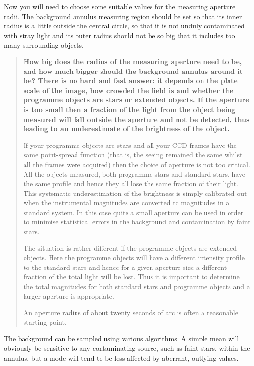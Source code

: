 \documentclass[twoside,11pt]{article}
\begin{document}
\begin{enumerate}
   Now you will need to choose some suitable values for the measuring
   aperture radii.  The background annulus measuring region should be set
   so that its inner radius is a little outside the central circle, so
   that it is not unduly contaminated with stray light and its outer radius
   should not be so big that it includes too many surrounding objects.

  \begin{quote}
   {\bf How big does the radius of the measuring aperture need to be, and
   how much bigger should the background annulus around it be? There is
   no hard and fast answer: it depends on the plate scale of the image,
   how crowded the field is and whether the programme objects are stars
   or extended objects.  If the aperture is too small then a fraction
   of the light from the object being measured will fall outside the
   aperture and not be detected, thus leading to an underestimate of
   the brightness of the object.

   If your programme objects are stars and all your CCD frames have the
   same point-spread function (that is, the seeing remained the same
   whilst all the frames were acquired) then the choice of aperture is
   not too critical.  All the objects measured, both programme stars and
   standard stars, have the same profile and hence they all lose the
   same fraction of their light.  This systematic underestimation of the
   brightness is simply calibrated out when the instrumental magnitudes are
   converted to magnitudes in a standard system.  In this case quite a
   small aperture can be used in order to minimise statistical errors
   in the background and contamination by faint stars.

   The situation is rather different if the programme objects are
   extended objects.  Here the programme objects will have a different
   intensity profile to the standard stars and hence for a given
   aperture size a different fraction of the total light will be lost.
   Thus it is important to determine the total magnitudes for both
   standard stars and programme objects and a larger aperture is
   appropriate.

   An aperture radius of about twenty seconds of arc is often a
   reasonable starting point.}
  \end{quote}

   The background can be sampled using various algorithms. A simple mean
   will obviously be sensitive to any contaminating source, such as
   faint stars, within the annulus, but a mode will tend to be less
   affected by aberrant, outlying values.


\end{enumerate}
\end{document}
